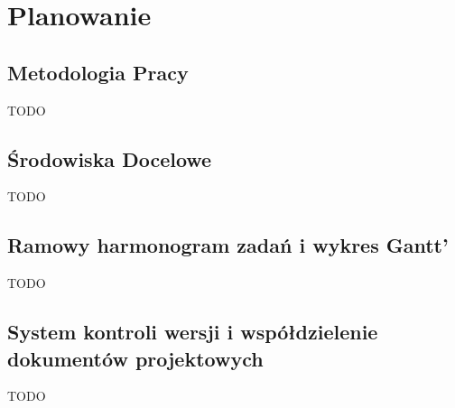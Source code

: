 
\chapter{Planowanie}
\label{ch:planowanie}

\section{Metodologia Pracy}
\label{sec:metodologia-pracy}

TODO

\section{Środowiska Docelowe}
\label{sec:srodowiska-docelowe}

TODO

\section{Ramowy harmonogram zadań i wykres Gantt’}
\label{sec:ramowy-harmonogram-zadan-i-wykres-gantt’}

TODO

\section{System kontroli wersji i współdzielenie dokumentów projektowych}
\label{sec:-system-kontroli-wersji-i-wspoldzielenie-dokumentow-projektowych}

TODO

